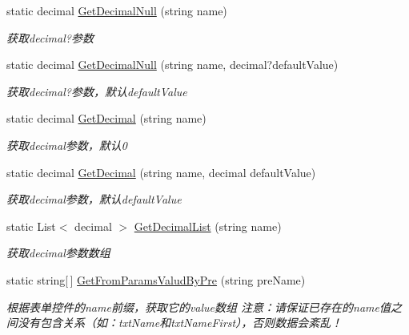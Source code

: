 \begin{DoxyCompactItemize}
static decimal \hyperlink{class_x_c_l_net_tools_1_1_string_hander_1_1_form_helper_a67ca5ec273b5b94c20a6fd79b0e3c3f7}{Get\-Decimal\-Null} (string name)
\begin{DoxyCompactList}\small\item\em 获取decimal?参数 \end{DoxyCompactList}\item 
static decimal \hyperlink{class_x_c_l_net_tools_1_1_string_hander_1_1_form_helper_ac94db6da5663acdc23ce3bc79ec99c12}{Get\-Decimal\-Null} (string name, decimal?default\-Value)
\begin{DoxyCompactList}\small\item\em 获取decimal?参数，默认default\-Value \end{DoxyCompactList}\item 
static decimal \hyperlink{class_x_c_l_net_tools_1_1_string_hander_1_1_form_helper_a61ef0cfc5b32dadd67700c5f307850d3}{Get\-Decimal} (string name)
\begin{DoxyCompactList}\small\item\em 获取decimal参数，默认0 \end{DoxyCompactList}\item 
static decimal \hyperlink{class_x_c_l_net_tools_1_1_string_hander_1_1_form_helper_ab147eaeb86996c9c03099a5bd6d6ac6d}{Get\-Decimal} (string name, decimal default\-Value)
\begin{DoxyCompactList}\small\item\em 获取decimal参数，默认default\-Value \end{DoxyCompactList}\item 
static List$<$ decimal $>$ \hyperlink{class_x_c_l_net_tools_1_1_string_hander_1_1_form_helper_ab3f5108e85eb8bf10ab5317e77bc1f2c}{Get\-Decimal\-List} (string name)
\begin{DoxyCompactList}\small\item\em 获取decimal参数数组 \end{DoxyCompactList}\item 
static string\mbox{[}$\,$\mbox{]} \hyperlink{class_x_c_l_net_tools_1_1_string_hander_1_1_form_helper_a5b0bd096fa3caa418a65570579394201}{Get\-From\-Params\-Valud\-By\-Pre} (string pre\-Name)
\begin{DoxyCompactList}\small\item\em 根据表单控件的name前缀，获取它的value数组 注意：请保证已存在的name值之间没有包含关系（如：txt\-Name和txt\-Name\-First），否则数据会紊乱！ \end{DoxyCompactList}\item 

\end{DoxyCompactItemize}
